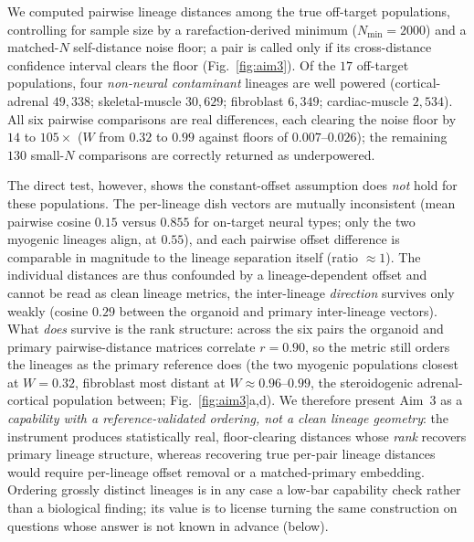 \documentclass[11pt]{article}
\begin{document}
We computed pairwise lineage distances among the true off-target populations, controlling for sample
size by a rarefaction-derived minimum ($N_{\min}=2000$) and a matched-$N$ self-distance noise floor; a
pair is called only if its cross-distance confidence interval clears the floor (Fig.~\ref{fig:aim3}).
Of the $17$ off-target populations, four \emph{non-neural contaminant} lineages are well powered
(cortical-adrenal $49{,}338$; skeletal-muscle $30{,}629$; fibroblast $6{,}349$; cardiac-muscle
$2{,}534$). All six pairwise
comparisons are real differences, each clearing the noise floor by $14$ to $105\times$
($W$ from $0.32$ to $0.99$ against floors of $0.007$--$0.026$); the remaining $130$ small-$N$
comparisons are correctly returned as underpowered.

The direct test, however, shows the constant-offset assumption does \emph{not} hold for these
populations. The per-lineage dish vectors are mutually inconsistent (mean pairwise cosine $0.15$ versus
$0.855$ for on-target neural types; only the two myogenic lineages align, at $0.55$), and each pairwise
offset difference is comparable in magnitude to the lineage separation itself (ratio $\approx\!1$). The
individual distances are thus confounded by a lineage-dependent offset and cannot be read as clean
lineage metrics, the inter-lineage \emph{direction} survives only weakly (cosine $0.29$ between the
organoid and primary inter-lineage vectors). What \emph{does} survive is the rank structure: across the
six pairs the organoid and primary pairwise-distance matrices correlate $r=0.90$, so the metric still
orders the lineages as the primary reference does (the two myogenic populations closest at $W=0.32$,
fibroblast most distant at $W\approx0.96$--$0.99$, the steroidogenic adrenal-cortical population between;
Fig.~\ref{fig:aim3}a,d). We therefore present Aim~3 as a \emph{capability with a reference-validated
ordering, not a clean lineage geometry}: the instrument produces statistically real, floor-clearing
distances whose \emph{rank} recovers primary lineage structure, whereas recovering true per-pair lineage
distances would require per-lineage offset removal or a matched-primary embedding. Ordering grossly
distinct lineages is in any case a low-bar capability check rather than a biological finding; its value
is to license turning the same construction on questions whose answer is not known in advance (below).

\end{document}
